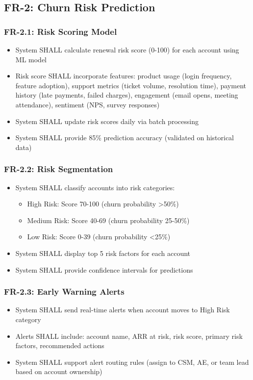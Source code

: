 \documentclass[12pt,a4paper]{article}
\begin{document}
\subsection{FR-2: Churn Risk Prediction}
\subsubsection{FR-2.1: Risk Scoring Model}
\begin{itemize}
    \item System SHALL calculate renewal risk score (0-100) for each account using ML model
    \item Risk score SHALL incorporate features: product usage (login frequency, feature adoption), support metrics (ticket volume, resolution time), payment history (late payments, failed charges), engagement (email opens, meeting attendance), sentiment (NPS, survey responses)
    \item System SHALL update risk scores daily via batch processing
    \item System SHALL provide 85\% prediction accuracy (validated on historical data)
\end{itemize}
\subsubsection{FR-2.2: Risk Segmentation}
\begin{itemize}
    \item System SHALL classify accounts into risk categories:
    \begin{itemize}
        \item High Risk: Score 70-100 (churn probability >50\%)
        \item Medium Risk: Score 40-69 (churn probability 25-50\%)
        \item Low Risk: Score 0-39 (churn probability <25\%)
    \end{itemize}
    \item System SHALL display top 5 risk factors for each account
    \item System SHALL provide confidence intervals for predictions
\end{itemize}
\subsubsection{FR-2.3: Early Warning Alerts}
\begin{itemize}
    \item System SHALL send real-time alerts when account moves to High Risk category
    \item Alerts SHALL include: account name, ARR at risk, risk score, primary risk factors, recommended actions
    \item System SHALL support alert routing rules (assign to CSM, AE, or team lead based on account ownership)
\end{itemize}
\end{document}
